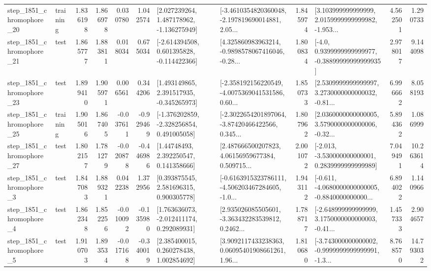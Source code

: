 \begin{tabular}{llrrrrllrlrr}
 step\_1851\_chromophore\_20 &  training &      1.836198 &    1.866978 &      0.030780 &  1.042574 &    [2.027239264, 1.487178962, -1.136275949] &  [-3.4610354820360048, -2.197819690014881, 2.05... &       1.845974 &  [3.103999999999999, 2.0159999999999982, -1.953... &            4.562501 &          1.290733 \\
 step\_1851\_chromophore\_21 &      test &      1.865777 &    1.883811 &      0.018034 &  0.675034 &   [-2.614394508, 0.601395828, -0.114422366] &  [4.325860983963214, -0.9898578067416046, -0.28... &       1.800834 &   [-4.0, 0.9399999999999977, -0.38899999999999935] &            2.978017 &          9.144098 \\
 step\_1851\_chromophore\_23 &      test &      1.899410 &    1.905971 &      0.006561 &  0.344206 &    [1.493149865, 2.391517935, -0.345265973] &  [-2.358192156220549, -4.0075369041531586, 0.60... &       1.850733 &  [2.5309999999999997, 3.2730000000000032, -0.81... &            6.996662 &          8.058193 \\
 step\_1851\_chromophore\_25 &  training &      1.905016 &    1.867405 &     -0.037611 & -0.929469 &   [-1.376202859, -2.328256854, 0.491005058] &  [-2.3022654201897064, -3.87420466422566, 0.345... &       1.807962 &  [2.0360000000000005, 3.5790000000000006, -0.32... &            5.894362 &          1.086999 \\
 step\_1851\_chromophore\_27 &      test &      1.802157 &    1.781279 &     -0.020878 & -0.446986 &      [1.44748493, 2.392250547, 0.141358666] &  [2.487666500207823, 4.06156959677384, 0.509715... &       2.001072 &   [-2.013, -3.530000000000001, 0.2839999999999989] &            7.049491 &         10.263614 \\
  step\_1851\_chromophore\_3 &      test &      1.847083 &    1.889321 &      0.042238 &  1.372956 &     [0.393875545, 2.581696315, 0.900305778] &  [-0.6163915323786111, -4.506203467284605, -1.0... &       1.943112 &  [-0.611, -4.0680000000000005, -0.8840000000000... &            6.894022 &          1.140966 \\
  step\_1851\_chromophore\_4 &      test &      1.862348 &    1.852256 &     -0.010092 & -0.135980 &    [1.763636073, -2.012411174, 0.292089931] &  [2.935026085505601, -3.363432283539812, 0.2462... &       1.788717 &  [-2.648999999999999, 3.1750000000000003, -0.41... &            1.457333 &          2.904657 \\
  step\_1851\_chromophore\_5 &      test &      1.910703 &    1.893534 &     -0.017168 & -0.340019 &     [2.385400015, 0.260278438, 1.002854692] &  [3.9092117433238363, 0.06095401908661261, 1.96... &       1.810680 &  [-3.743000000000002, -0.9999999999999991, -1.3... &            8.768570 &         14.793032 \\

\end{tabular}
